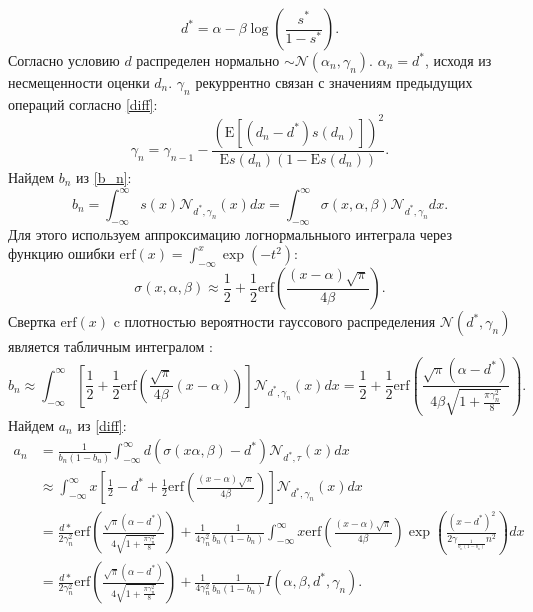 \begin{equation}
    d^* = \alpha  - \beta \log\left(\frac{s^*}{1-s^*}\right).
\end{equation}
Согласно условию $d$ распределен нормально $\sim \mathcal{N}(\alpha_n,\gamma_n)$. $\alpha_n = d^*$, исходя из несмещенности оценки $d_n$. $\gamma_n$ рекуррентно связан с значениям предыдущих операций согласно \ref{diff}:
\begin{equation}
    \label{gamma_connection}
    \gamma_n = \gamma_{n-1} - \frac{\left(\mathrm{E} \left[ (d_n-d^*) s(d_n)\right] \right)^2}{\mathrm{E}s(d_n)(1 - \mathrm{E}s(d_n))}.
\end{equation}
Найдем $b_n$ из \ref{b_n}:
\begin{equation}
    b_n = \int_{-\infty}^{\infty} s(x) \mathcal{N}_{d^*,\gamma_n}(x) d x = \int_{-\infty}^{\infty} \sigma(x,\alpha,\beta) \mathcal{N}_{d^*,\gamma_n} d x.
\end{equation}
Для этого используем аппроксимацию логнормальныого интеграла через функцию ошибки $\text{erf}(x) = \int_{-\infty}^x \exp(-t^2)$:
\begin{equation}
     \sigma(x, \alpha, \beta) \approx \frac{1}{2} + \frac{1}{2} \text{erf}\left(\frac{(x-\alpha)\sqrt{\pi}}{4 \beta}\right).   
\end{equation}
Свертка  $\text{erf}(x)$ c плотностью вероятности гауссового распределения $\mathcal{N}(d^*,\gamma_n)$ является табличным интегралом \cite{ng1969table}:
\begin{equation}
    b_n \approx \int_{-\infty}^{\infty} \left[\frac{1}{2} + \frac{1}{2} \text{erf}\left(\frac{\sqrt{\pi}}{4\beta} (x-\alpha) \right) \right] \mathcal{N}_{d^*,\gamma_n}(x) dx = 
    \frac{1}{2} + \frac{1}{2} \text{erf}\left(\frac{\sqrt{\pi} (\alpha-d^*)}{4 \beta \sqrt{1+\frac{\pi\gamma_n^2}{8}}} \right).
\end{equation}
Найдем $a_n$ из \ref{diff}:
\begin{equation}
    \label{a_n}
    \begin{aligned}
          a_n &= \frac{1}{b_n(1-b_n)} \int_{-\infty}^{\infty} d (\sigma(x\alpha,\beta) -d^*) \mathcal{N}_{d^*,\tau}(x)  dx \\  
          &\approx  \int_{-\infty}^{\infty} x \left[\frac{1}{2} - d^* + \frac{1}{2} \text{erf}\left(\frac{(x-\alpha)\sqrt{\pi}}{4 \beta}\right)\right] \mathcal{N}_{d^*,\gamma_n}(x) dx \\
          &= \frac{d*}{2 \gamma_n^2} \text{erf}\left(\frac{\sqrt{\pi} (\alpha-d^*)}{4 \sqrt{1+\frac{\pi\gamma_n^2}{8}}} \right)  + \frac{1}{4 \gamma_n^2} \frac{1}{b_n(1-b_n)} \int_{-\infty}^{\infty} x \text{erf}\left(\frac{(x-\alpha)\sqrt{\pi}}{4 \beta}\right) \exp\left(\frac{(x-d^*)^2}{2 \gamma_\frac{1}{b_n(1-b_n)}n^2}\right) dx \\
          & = \frac{d*}{2 \gamma_n^2} \text{erf}\left(\frac{\sqrt{\pi} (\alpha-d^*)}{4 \sqrt{1+\frac{\pi\gamma_n^2}{8}}} \right) + \frac{1}{4 \gamma_n^2} \frac{1}{b_n(1-b_n)} I(\alpha,\beta,d^*,\gamma_n).
    \end{aligned}
\end{equation}
